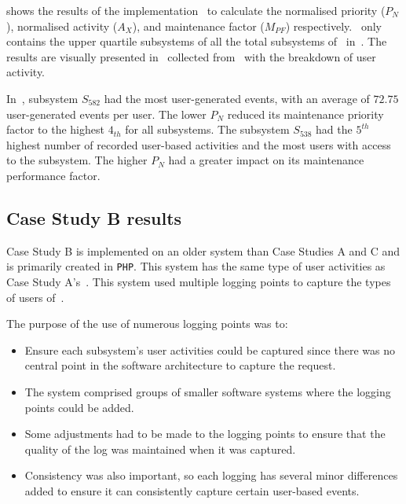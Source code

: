 

 shows the results of the implementation~ to calculate the normalised priority ($P_N$), normalised activity ($A_X$), and maintenance factor ($M_{PF}$) respectively.~ only contains the upper quartile subsystems of all the total subsystems of~ in~. The results are visually presented in~ collected from~ with the breakdown of user activity. \par In~, subsystem $S_{582}$ had the most user-generated events, with an average of $72.75$ user-generated events per user. The lower $P_N$ reduced its maintenance priority factor to the highest $4_{th}$ for all subsystems. The subsystem $S_{538}$ had the $5^{th}$ highest number of recorded user-based activities and the most users with access to the subsystem. The higher $P_N$ had a greater impact on its maintenance performance factor. 

\clearpage

\subsection{Case Study B results}\label{sec:ch3_csB}
Case Study B is implemented on an older system than Case Studies A and C and is primarily created in \texttt{PHP}. This system has the same type of user activities as Case Study A's~. This system used multiple logging points to capture the types of users of~. \par The purpose of the use of numerous logging points was to:

\begin{itemize}
	\item Ensure each subsystem's user activities could be captured since there was no central point in the software architecture to capture the request. 
	\item The system comprised groups of smaller software systems where the logging points could be added.
	\item Some adjustments had to be made to the logging points to ensure that the quality of the log was maintained when it was captured. 
	\item Consistency was also important, so each logging has several minor differences added to ensure it can consistently capture certain user-based events.
\end{itemize}

